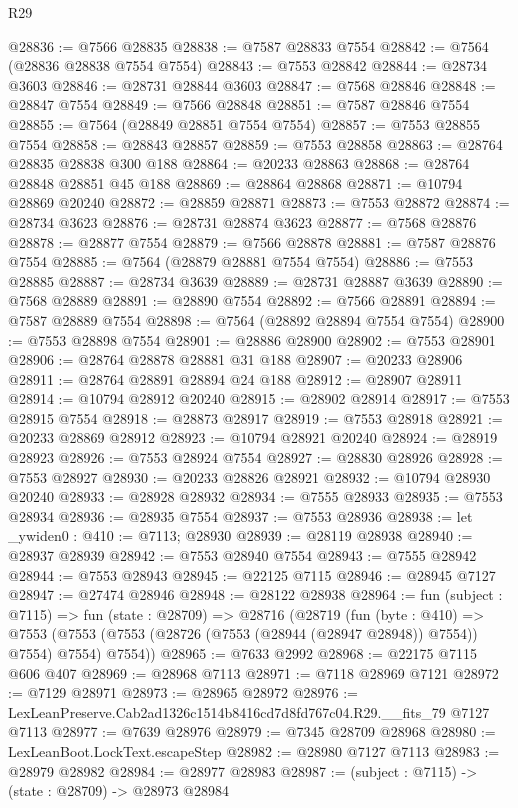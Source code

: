 \begin{lexlean}{R29}
\begin{coremodule}
@28836 := @7566 @28835
@28838 := @7587 @28833 @7554
@28842 := @7564 (@28836 @28838 @7554 @7554)
@28843 := @7553 @28842
@28844 := @28734 @3603
@28846 := @28731 @28844 @3603
@28847 := @7568 @28846
@28848 := @28847 @7554
@28849 := @7566 @28848
@28851 := @7587 @28846 @7554
@28855 := @7564 (@28849 @28851 @7554 @7554)
@28857 := @7553 @28855 @7554
@28858 := @28843 @28857
@28859 := @7553 @28858
@28863 := @28764 @28835 @28838 @300 @188
@28864 := @20233 @28863
@28868 := @28764 @28848 @28851 @45 @188
@28869 := @28864 @28868
@28871 := @10794 @28869 @20240
@28872 := @28859 @28871
@28873 := @7553 @28872
@28874 := @28734 @3623
@28876 := @28731 @28874 @3623
@28877 := @7568 @28876
@28878 := @28877 @7554
@28879 := @7566 @28878
@28881 := @7587 @28876 @7554
@28885 := @7564 (@28879 @28881 @7554 @7554)
@28886 := @7553 @28885
@28887 := @28734 @3639
@28889 := @28731 @28887 @3639
@28890 := @7568 @28889
@28891 := @28890 @7554
@28892 := @7566 @28891
@28894 := @7587 @28889 @7554
@28898 := @7564 (@28892 @28894 @7554 @7554)
@28900 := @7553 @28898 @7554
@28901 := @28886 @28900
@28902 := @7553 @28901
@28906 := @28764 @28878 @28881 @31 @188
@28907 := @20233 @28906
@28911 := @28764 @28891 @28894 @24 @188
@28912 := @28907 @28911
@28914 := @10794 @28912 @20240
@28915 := @28902 @28914
@28917 := @7553 @28915 @7554
@28918 := @28873 @28917
@28919 := @7553 @28918
@28921 := @20233 @28869 @28912
@28923 := @10794 @28921 @20240
@28924 := @28919 @28923
@28926 := @7553 @28924 @7554
@28927 := @28830 @28926
@28928 := @7553 @28927
@28930 := @20233 @28826 @28921
@28932 := @10794 @28930 @20240
@28933 := @28928 @28932
@28934 := @7555 @28933
@28935 := @7553 @28934
@28936 := @28935 @7554
@28937 := @7553 @28936
@28938 := let _ywiden0 : @410 := @7113; @28930
@28939 := @28119 @28938
@28940 := @28937 @28939
@28942 := @7553 @28940 @7554
@28943 := @7555 @28942
@28944 := @7553 @28943
@28945 := @22125 @7115
@28946 := @28945 @7127
@28947 := @27474 @28946
@28948 := @28122 @28938
@28964 := fun (subject : @7115) =>
  fun (state : @28709) =>
  @28716
    (@28719
      (fun (byte : @410) =>
      @7553 (@7553 (@7553 (@28726 (@7553 (@28944 (@28947 @28948)) @7554)) @7554) @7554) @7554))
@28965 := @7633 @2992
@28968 := @22175 @7115 @606 @407
@28969 := @28968 @7113
@28971 := @7118 @28969 @7121
@28972 := @7129 @28971
@28973 := @28965 @28972
@28976 := LexLeanPreserve.Cab2ad1326c1514b8416cd7d8fd767c04.R29.__fits_79 @7127 @7113
@28977 := @7639 @28976
@28979 := @7345 @28709 @28968
@28980 := LexLeanBoot.LockText.escapeStep
@28982 := @28980 @7127 @7113
@28983 := @28979 @28982
@28984 := @28977 @28983
@28987 := (subject : @7115) -> (state : @28709) -> @28973 @28984

\end{coremodule}
\end{lexlean}
